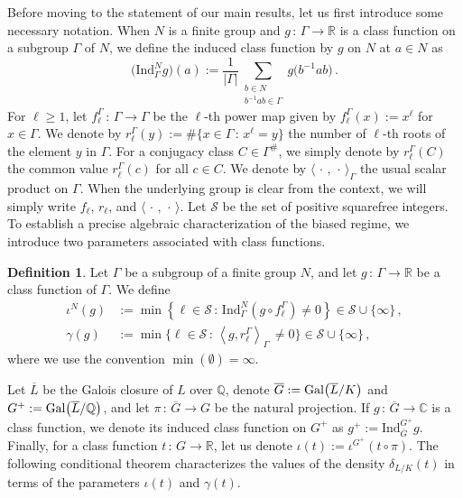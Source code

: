 \documentclass[12pt]{amsart}
\numberwithin{equation}{section}
\newcommand{\Gal}{{\rm Gal}}
\newcommand{\Q}{\mathbb Q}
\newcommand{\R}{\mathbb R}
\newcommand{\C}{\mathbb C}
\theoremstyle{definition}
\newtheorem{defi}[X]{Definition}
\theoremstyle{remark}
\begin{document}
Before moving to the statement of our main results, let us first introduce some necessary notation. When $N$ is a finite group and $g\, \colon\,  \Gamma\to \R$ is a class function on a subgroup $\Gamma$ of $N$, we define the induced class function by $g$ on $N$ at $a\in N$ as
\[ \bigl(\mathrm{Ind}_\Gamma^Ng\bigr)(a):=\frac{1}{\bigl|\Gamma\bigr|}\sum_{\substack{b\in N\\ b^{-1}ab\in \Gamma}} g\bigl(b^{-1}ab\bigr)\, . \]
For $\ell\ge 1$, let $f_\ell^\Gamma\, \colon\, \Gamma\to \Gamma$ be the $\ell$-th power map given by $f_\ell^\Gamma(x):=x^\ell$ for $x\in \Gamma$. We denote by $r_\ell^\Gamma(y):=\#\bigl\{x\in \Gamma\, \colon\, x^\ell=y\bigr\} $ the number of $\ell$-th roots of the element $y$ in $\Gamma$. For a conjugacy class $C\in \Gamma^\#$, we simply denote by $r_\ell^\Gamma(C)$ the common value $r_\ell^\Gamma(c)$ for all $c\in C$. We denote by $\langle\,\cdot\,,\,\cdot\, \rangle_\Gamma$ the usual scalar product on $\Gamma$. When the underlying group is clear from the context, we will simply write $f_\ell$, $r_\ell$, and $\langle\,\cdot\,,\,\cdot\, \rangle$. Let $\mathcal{S}$ be the set of positive squarefree integers.
To establish a precise algebraic characterization of the biased regime, we introduce two parameters associated with class functions. 
\begin{defi}\label{iota-gamma}
    Let $\Gamma $ be a subgroup of a finite group $N$, and let $g\, \colon\,  \Gamma\to \R$ be a class function of $\Gamma$. We define \begin{align*}\iota^{N}(g)&:=\min\left\{ \ell\in \mathcal{S}\, \colon\,  \mathrm{Ind}_\Gamma^N (g\circ f_\ell^\Gamma)\ne 0\right\}\in \mathcal{S}\cup \{\infty\}\, ,\\
    \gamma(g)&:=\min \{\ell\in \mathcal{S}\, \colon\,  \left\langle g,r_\ell^\Gamma\right\rangle_\Gamma\,\ne 0\}\in \mathcal{S}\cup \{\infty\}\, ,
    \end{align*}
    where we use the convention $\min(\emptyset)=\infty$.
\end{defi}
Let $\overline{L}$ be the Galois closure of $L$ over $\Q$, denote $\overline{G}:=\Gal\bigl(\overline{L}/K\bigr)$ and $G^+:=\Gal\bigl(\overline{L}/\Q\bigr)$, and let $\pi\, \colon\,  \overline{G}\to G $ be the natural projection. If $g\, \colon\,  \overline{G}\to \C$ is a class function, we denote its induced class function on $G^+$ as $g^+:=\mathrm{Ind}_{\overline{G}}^{G^+} g$. Finally, for a class function $t\, \colon\,  G\to \R$, let us denote $\iota(t):=\iota^{G^+}(t\circ \pi)$.
The following conditional theorem characterizes the values of the density $\delta_{L/K}(t)$ in terms of the parameters $\iota(t)$ and $\gamma(t)$.
\end{document}
